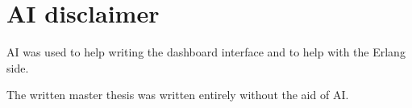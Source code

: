 \chapter*{AI disclaimer}
    AI was used to help writing the dashboard interface and to help with the Erlang side.

    The written master thesis was written entirely without the aid of AI.
